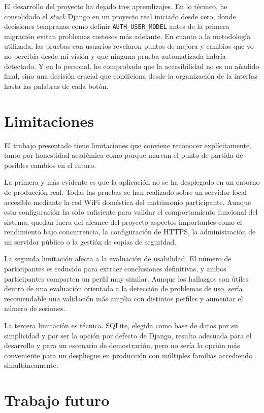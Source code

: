 El desarrollo del proyecto ha dejado tres aprendizajes. En lo técnico, he
consolidado el \emph{stack} Django en un proyecto real iniciado desde cero,
donde decisiones tempranas como definir \texttt{AUTH\_USER\_MODEL} antes de
la primera migración evitan problemas costosos más adelante. En cuanto a la metodología utilizada, las pruebas con usuarios revelaron puntos de mejora y cambios que yo no percibía desde mi visión y que
ninguna prueba automatizada habría detectado. Y en lo personal, he
comprobado que la accesibilidad no es un añadido final, sino una decisión
crucial que condiciona desde la organización de la interfaz hasta las
palabras de cada botón.

\section{Limitaciones\label{SEC:CONC_LIMITACIONES}}

El trabajo presentado tiene limitaciones que conviene reconocer explícitamente,
tanto por honestidad académica como porque marcan el punto de partida de posibles cambios en el futuro.

La primera y más evidente es que la aplicación no se ha desplegado en un entorno
de producción real. Todas las pruebas se han realizado sobre un servidor local accesible mediante la red
WiFi doméstica del matrimonio participante. Aunque esta configuración ha sido
suficiente para validar el comportamiento funcional del sistema, quedan fuera
del alcance del proyecto aspectos importantes como el rendimiento bajo
concurrencia, la configuración de HTTPS, la administración de un servidor público
o la gestión de copias de seguridad.

La segunda limitación afecta a la evaluación de usabilidad. El número de
participantes es reducido para extraer conclusiones definitivas, y ambos participantes comparten un perfil muy similar. Aunque
los hallazgos son útiles dentro de una evaluación orientada a la
detección de problemas de uso, sería recomendable una validación más amplia con distintos perfiles y aumentar el número de sesiones.

La tercera limitación es técnica. SQLite, elegida como base de datos por su
simplicidad y por ser la opción por defecto de Django, resulta adecuada para el
desarrollo y para un escenario de demostración, pero no sería la opción más
conveniente para un despliegue en producción con múltiples familias accediendo
simultáneamente.

\section{Trabajo futuro\label{SEC:CONC_FUTURO}}

